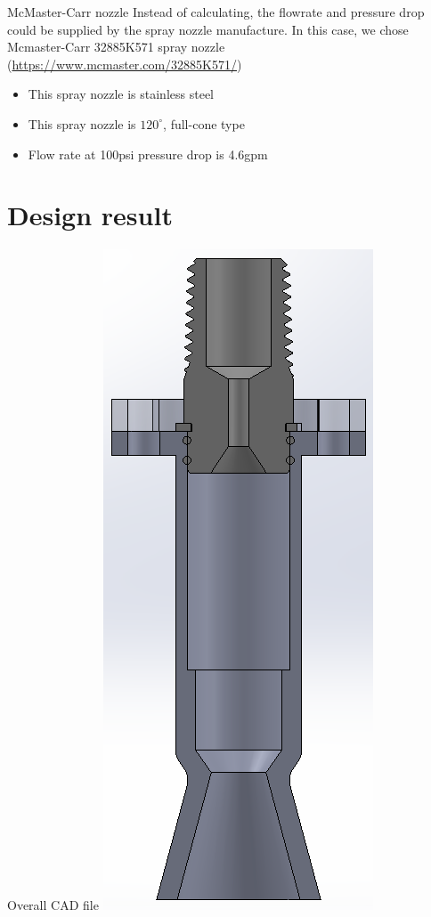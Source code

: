 \documentclass{beamer}
\begin{document}
\begin{frame}{McMaster-Carr nozzle}
    Instead of calculating, the flowrate and pressure drop could be supplied by the spray nozzle manufacture. In this case, we chose Mcmaster-Carr 32885K571 spray nozzle (\url{https://www.mcmaster.com/32885K571/}) 
    \begin{itemize}
        \item This spray nozzle is stainless steel
        \item This spray nozzle is $120^{\circ}$, full-cone type
        \item Flow rate at 100psi pressure drop is 4.6gpm
    \end{itemize}
\end{frame}

\section{Design result}
\begin{frame}{Overall CAD file}
    \centering \includegraphics[height=0.9\textheight]{images/engine_assembly.png}
\end{frame}
\end{document}
